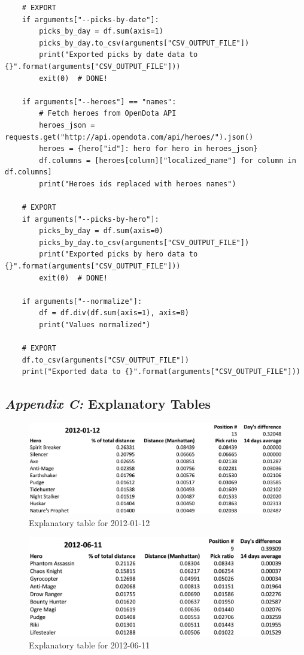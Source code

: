 \begin{verbatim}
    # EXPORT
    if arguments["--picks-by-date"]:
        picks_by_day = df.sum(axis=1)
        picks_by_day.to_csv(arguments["CSV_OUTPUT_FILE"])
        print("Exported picks by date data to {}".format(arguments["CSV_OUTPUT_FILE"]))
        exit(0)  # DONE!

    if arguments["--heroes"] == "names":
        # Fetch heroes from OpenDota API
        heroes_json = requests.get("http://api.opendota.com/api/heroes/").json()
        heroes = {hero["id"]: hero for hero in heroes_json}
        df.columns = [heroes[column]["localized_name"] for column in df.columns]
        print("Heroes ids replaced with heroes names")

    # EXPORT
    if arguments["--picks-by-hero"]:
        picks_by_day = df.sum(axis=0)
        picks_by_day.to_csv(arguments["CSV_OUTPUT_FILE"])
        print("Exported picks by hero data to {}".format(arguments["CSV_OUTPUT_FILE"]))
        exit(0)  # DONE!

    if arguments["--normalize"]:
        df = df.div(df.sum(axis=1), axis=0)
        print("Values normalized")

    # EXPORT
    df.to_csv(arguments["CSV_OUTPUT_FILE"])
    print("Exported data to {}".format(arguments["CSV_OUTPUT_FILE"]))
\end{verbatim}

\clearpage

\subsection*{\emph{Appendix C:} Explanatory Tables}
\label{subsec:explanatory-tables}

\begin{figure}[H]
    \centering
    \caption{Explanatory table for 2012-01-12}
    \label{fig:20120112}
    \includegraphics[width=1\textwidth]{20120112.png}
\end{figure}

\begin{figure}[H]
    \centering
    \caption{Explanatory table for 2012-06-11}
    \label{fig:20120611}
    \includegraphics[width=1\textwidth]{20120611.png}
\end{figure}

